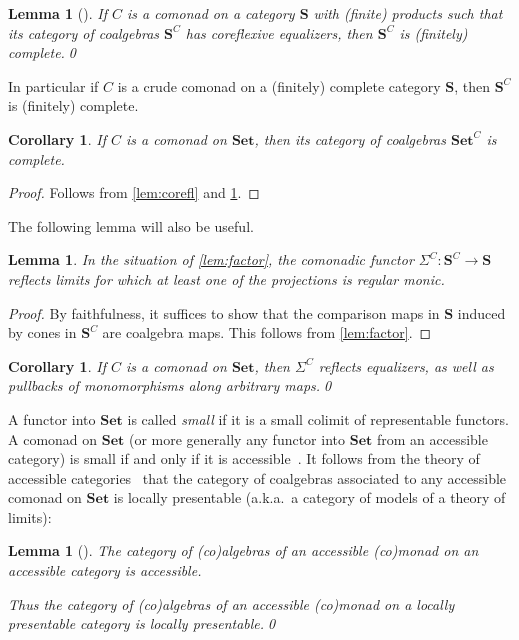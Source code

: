 \documentclass[11pt, oneside, article]{memoir}
\theoremstyle{plain}
\newtheorem{corollary}[theorem]{Corollary}
\newtheorem{lemma}[theorem]{Lemma}
\theoremstyle{definition}
\theoremstyle{remark}
\newcommand{\namedcat}[1]{\mathbf{#1}}
\newcommand{\cat}[1]{\mathbf{#1}}
\newcommand{\Set}{\namedcat{Set}}
\newcommand{\CoalgOn}[2]{{#2}^{#1}}
\newcommand{\CoalgSet}[1]{\CoalgOn{#1}{\Set}}
\newcommand{\CoalgS}[1]{\CoalgOn{#1}{\bS}}
\newcommand{\carr}{\Sigma}
\newcommand{\car}[1]{\carr^{#1}}
\newcommand{\carC}{\car{\cC}}
\newcommand{\cmnd}[1]{{#1}}
\newcommand{\cC}{\cmnd{C}}
\newcommand{\bS}{\cat{S}}
\newcommand{\CSet}{\CoalgSet{\cC}}
\newcommand{\CS}{\CoalgS{\cC}}
\begin{document}
\begin{lemma}[{\cite{linton}}]\label{lem:linton}
  If $\cC$ is a comonad on a category $\bS$ with (finite) products such
  that its category of coalgebras $\CS$ has coreflexive
  equalizers, then $\CS$ is (finitely) complete.\qed
\end{lemma}

In particular if $\cC$ is a crude comonad on a (finitely) complete
category $\bS$, then $\CS$ is (finitely) complete.

\begin{corollary}\label{lem:complete}
  If $\cC$ is a comonad on $\Set$, then its category of coalgebras
  $\CSet$ is complete.
\end{corollary}
\begin{proof}
  Follows from \cref{lem:corefl} and \cref{lem:linton}.
\end{proof}

The following lemma will also be useful.

\begin{lemma}
  In the situation of \cref{lem:factor}, the comonadic functor
  $\carC \colon \CS \to \bS$ reflects limits for which at least one of
  the projections is regular monic.
\end{lemma}
\begin{proof}
  By faithfulness, it suffices to show that the comparison maps in
  $\bS$ induced by cones in $\CS$ are coalgebra maps. This follows from
  \cref{lem:factor}.
\end{proof}

\begin{corollary}\label{lem:reflect}
  If $\cC$ is a comonad on $\Set$, then $\carC$ reflects equalizers,
  as well as pullbacks of monomorphisms along arbitrary maps.\qed
\end{corollary}

A functor into $\Set$ is called \emph{small} if it is a small colimit
of representable functors. A comonad on $\Set$ (or more generally any
functor into $\Set$ from an accessible category) is small if and only
if it is accessible~\cite[Proposition 2.4.2(i)]{makkai-pare}. It
follows from the theory of accessible
categories~\cite{makkai-pare,adamek-rosicky} that the category of
coalgebras associated to any accessible comonad on $\Set$ is locally
presentable (a.k.a.\ a category of models of a theory of limits):

\begin{lemma}[{\cite[Proposition A.2 (4)]{henry}}]\label{lem:accessibility}\label{lem:presentability}
  The category of (co)algebras of an accessible (co)monad on an
  accessible category is accessible.

  Thus the category of (co)algebras of an accessible (co)monad on a
  locally presentable category is locally presentable.\qed
\end{lemma}
\end{document}
